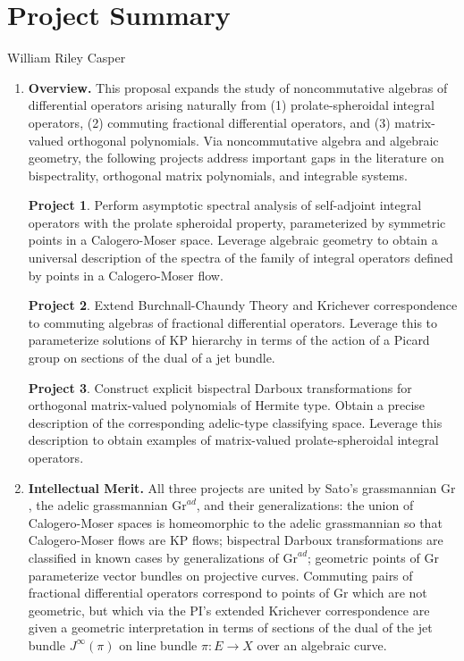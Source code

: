 \documentclass[11pt,letterpaper]{article}
\newcommand{\required}[1]{\section*{\hfil #1\hfil}}                    %
\theoremstyle{definition}
\newtheorem{goal}{Project}
\newcommand{\Gr}{\text{Gr}}
\begin{document}
\required{Project Summary}
\begin{center}
William Riley Casper
\end{center}

\begin{enumerate}[(1)]
\item{\textbf{Overview.}}
This proposal expands the study of noncommutative algebras of differential operators arising naturally from (1) prolate-spheroidal integral operators, (2) commuting fractional differential operators, and (3) matrix-valued orthogonal polynomials.
Via noncommutative algebra and algebraic geometry, the following projects address important gaps in the literature on bispectrality, orthogonal matrix polynomials, and integrable systems.
\begin{goal}\label{goal1}
Perform asymptotic spectral analysis of self-adjoint integral operators with the prolate spheroidal property, parameterized by symmetric points in a Calogero-Moser space.
Leverage algebraic geometry to obtain a universal description of the spectra of the family of integral operators defined by points in a Calogero-Moser flow.
\end{goal}
\begin{goal}\label{goal2}
Extend Burchnall-Chaundy Theory and Krichever correspondence to commuting algebras of fractional differential operators.
Leverage this to parameterize solutions of KP hierarchy in terms of the action of a Picard group on sections of the dual of a jet bundle.
\end{goal}
\begin{goal}\label{goal3}
Construct explicit bispectral Darboux transformations for orthogonal matrix-valued polynomials of Hermite type.
Obtain a precise description of the corresponding adelic-type classifying space.
Leverage this description to obtain examples of matrix-valued prolate-spheroidal integral operators.
\end{goal}
\item{\textbf{Intellectual Merit.}}
All three projects are united by Sato's grassmannian $\Gr$, the adelic grassmannian $\Gr^{ad}$, and their generalizations:
the union of Calogero-Moser spaces is homeomorphic to the adelic grassmannian so that Calogero-Moser flows are KP flows; bispectral Darboux transformations are classified in known cases by generalizations of $\Gr^{ad}$; geometric points of $\Gr$ parameterize vector bundles on projective curves.
Commuting pairs of fractional differential operators correspond to points of $\Gr$ which are not geometric, but which via the PI's extended Krichever correspondence are given a geometric interpretation in terms of sections of the dual of the jet bundle $J^\infty(\pi)$ on line bundle $\pi: E\rightarrow X$ over an algebraic curve.


\end{enumerate}
\end{document}
